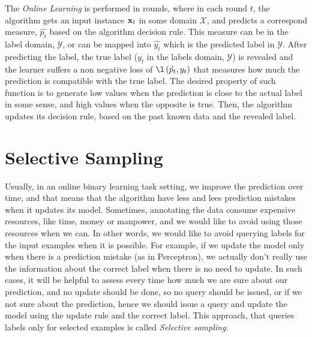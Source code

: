 %


The \textit{Online Learning} is performed in rounds, where in each round $t$, 
the algorithm gets an input instance $\mathbf{x}_{t}$ in some domain $\mathcal{X}$, and predicts a  correspond 
measure, $\hat{p_t}$ based on the algorithm decision rule. This measure can be in the label domain, 
$\mathcal{Y}$, or can be mapped into $\hat{y_t}$ which is the predicted label in $\mathcal{Y}$.   
After predicting the label, the true label ($y_t$ in the labels domain, $\mathcal{Y}$)  is revealed 
and the learner suffers a non negative loss of $\l\paren{\hat{p_t},y_t}$ that measures how much the 
prediction is compatible with the true label. The desired property of such function is to generate low 
values when the prediction is close to the actual label in some sense, and high values when the opposite 
is true. Then, the algorithm updates its decision rule, based on the past known data and the revealed label. 

\section{Selective Sampling}
\label{sec:selective_sampling}

Usually, in an  online binary learning task setting, we improve the prediction over time, 
and that means that the algorithm  have less and lees prediction mistakes when it updates its model. 
Sometimes, annotating the data consume expensive resources, like time, money or manpower, 
and we would like to avoid using those resources when we can. In other words, we would like 
to avoid querying labels for the input examples when it is possible. For example, if we  update the 
model only when there is a prediction mistake (as in Perceptron), we actually don't really 
use the information about the correct label when there is no need to update. In such cases, 
it will be helpful to assess every time how much we are sure about our prediction, and no update should be done, 
so no query should be issued, or if we not sure about the prediction, hence we should issue a 
query and update the model using the update rule and the correct label. 
This approach, that queries labels only for selected examples is called \textit{Selective sampling.}

